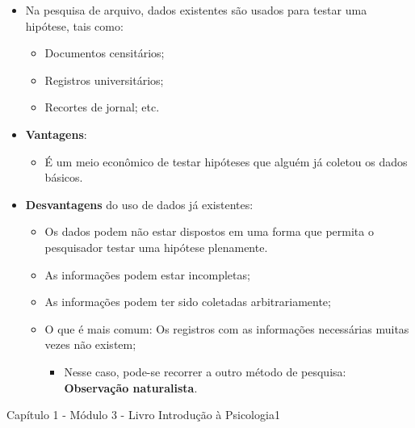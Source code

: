 \documentclass[
]{book}
\providecommand{\tightlist}{%
  \setlength{\itemsep}{0pt}\setlength{\parskip}{0pt}}
\begin{document}
\begin{itemize}
\tightlist
\item
  Na pesquisa de arquivo, dados existentes são usados para testar uma
  hipótese, tais como:

  \begin{itemize}
  \tightlist
  \item
    Documentos censitários;
  \item
    Registros universitários;
  \item
    Recortes de jornal; etc.
  \end{itemize}
\item
  \textbf{Vantagens}:

  \begin{itemize}
  \tightlist
  \item
    É um meio econômico de testar hipóteses que alguém já coletou os
    dados básicos.
  \end{itemize}
\item
  \textbf{Desvantagens} do uso de dados já existentes:

  \begin{itemize}
  \tightlist
  \item
    Os dados podem não estar dispostos em uma forma que permita o
    pesquisador testar uma hipótese plenamente.
  \item
    As informações podem estar incompletas;
  \item
    As informações podem ter sido coletadas arbitrariamente;
  \item
    O que é mais comum: Os registros com as informações necessárias
    muitas vezes não existem;

    \begin{itemize}
    \tightlist
    \item
      Nesse caso, pode-se recorrer a outro método de pesquisa:
      \textbf{Observação naturalista}.
    \end{itemize}
  \end{itemize}
\end{itemize}

Capítulo 1 - Módulo 3 - Livro Introdução à
Psicologia1
\end{document}
